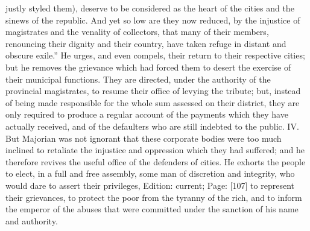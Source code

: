 justly styled them), deserve to be considered as the heart of the cities and the sinews of the republic. And yet so low are they now reduced, by the injustice of magistrates and the venality of collectors, that many of their members, renouncing their dignity and their country, have taken refuge in distant and obscure exile.\texthebrew{}” He urges, and even compels, their return to their respective cities; but he removes the grievance which had forced them to desert the exercise of their municipal functions. They are directed, under the authority of the provincial magistrates, to resume their office of levying the tribute; but, instead of being made responsible for the whole sum assessed on their district, they are only required to produce a regular account of the payments which they have actually received, and of the defaulters who are still indebted to the public. IV. But Majorian was not ignorant that these corporate bodies were too much inclined to retaliate the injustice and oppression which they had suffered; and he therefore revives the useful office of the defenders of cities. He exhorts the people to elect, in a full and free assembly, some man of discretion and integrity, who would dare to assert their privileges, Edition: current; Page: [107] to represent their grievances, to protect the poor from the tyranny of the rich, and to inform the emperor of the abuses that were committed under the sanction of his name and authority.

